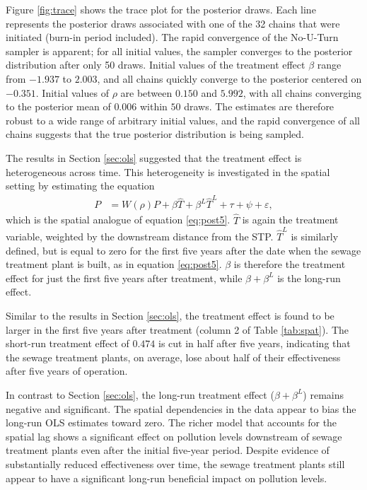 \documentclass[12pt]{article}
\newcommand{\e}{\varepsilon}
\newcommand{\anum}[1]{\begin{align}#1\end{align}}
\begin{document}
Figure \ref{fig:trace} shows the trace plot for the posterior draws. Each line represents the posterior draws associated with one of the 32 chains that were initiated (burn-in period included). The rapid convergence of the No-U-Turn sampler is apparent; for all initial values, the sampler converges to the posterior distribution after only 50 draws. Initial values of the treatment effect $\beta$ range from $-1.937$ to $2.003$, and all chains quickly converge to the posterior centered on $-0.351$. Initial values of $\rho$ are between $0.150$ and $5.992$, with all chains converging to the posterior mean of $0.006$ within $50$ draws. The estimates are therefore robust to a wide range of arbitrary initial values, and the rapid convergence of all chains suggests that the true posterior distribution is being sampled.

The results in Section \ref{sec:ols} suggested that the treatment effect is heterogeneous across time. This heterogeneity is investigated in the spatial setting by estimating the equation
\anum{
  P & = W(\rho)P + \beta \widehat{T} + \beta^L \widehat{T}^L + \tau + \psi + \e, \label{eq:spathettime}
}
which is the spatial analogue of equation \eqref{eq:post5}. $\widehat{T}$ is again the treatment variable, weighted by the downstream distance from the STP. $\widehat{T}^L$ is similarly defined, but is equal to zero for the first five years after the date when the sewage treatment plant is built, as in equation \eqref{eq:post5}. $\beta$ is therefore the treatment effect for just the first five years after treatment, while $\beta + \beta^L$ is the long-run effect. 

Similar to the results in Section \ref{sec:ols}, the treatment effect is found to be larger in the first five years after treatment (column 2 of Table \ref{tab:spat}). The short-run treatment effect of $0.474$ is cut in half after five years, indicating that the sewage treatment plants, on average, lose about half of their effectiveness after five years of operation. 

In contrast to Section \ref{sec:ols}, the long-run treatment effect ($\beta + \beta^L$) remains negative and significant. The spatial dependencies in the data appear to bias the long-run OLS estimates toward zero. The richer model that accounts for the spatial lag shows a significant effect on pollution levels downstream of sewage treatment plants even after the initial five-year period. Despite evidence of substantially reduced effectiveness over time, the sewage treatment plants still appear to have a significant long-run beneficial impact on pollution levels. 
\end{document}
